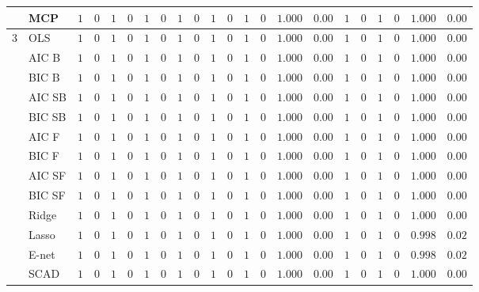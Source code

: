 \begin{tabular}{p{0.2cm}p{1cm}|p{0.6cm}p{0.6cm}|p{0.6cm}p{0.6cm}p{0.6cm}p{0.6cm}p{0.6cm}p{0.6cm}|p{0.6cm}p{0.6cm}p{0.6cm}p{0.6cm}p{0.6cm}p{0.6cm}|p{0.6cm}p{0.6cm}p{0.6cm}p{0.6cm}p{0.6cm}p{0.6cm}}
 & MCP  & $1$ & $0$ & $1$ & $0$ & $1$ & $0$ & $1$ & $0$ & $1$ & $0$ & $1$ & $0$ & $1.000$ & $0.00$ & $1$ & $0$ & $1$ & $0$ & $1.000$ & $0.00$ \\\hline
3 & OLS  & $1$ & $0$ & $1$ & $0$ & $1$ & $0$ & $1$ & $0$ & $1$ & $0$ & $1$ & $0$ & $1.000$ & $0.00$ & $1$ & $0$ & $1$ & $0$ & $1.000$ & $0.00$ \\
 & AIC B  & $1$ & $0$ & $1$ & $0$ & $1$ & $0$ & $1$ & $0$ & $1$ & $0$ & $1$ & $0$ & $1.000$ & $0.00$ & $1$ & $0$ & $1$ & $0$ & $1.000$ & $0.00$ \\
 & BIC B  & $1$ & $0$ & $1$ & $0$ & $1$ & $0$ & $1$ & $0$ & $1$ & $0$ & $1$ & $0$ & $1.000$ & $0.00$ & $1$ & $0$ & $1$ & $0$ & $1.000$ & $0.00$ \\
 & AIC SB  & $1$ & $0$ & $1$ & $0$ & $1$ & $0$ & $1$ & $0$ & $1$ & $0$ & $1$ & $0$ & $1.000$ & $0.00$ & $1$ & $0$ & $1$ & $0$ & $1.000$ & $0.00$ \\
 & BIC SB  & $1$ & $0$ & $1$ & $0$ & $1$ & $0$ & $1$ & $0$ & $1$ & $0$ & $1$ & $0$ & $1.000$ & $0.00$ & $1$ & $0$ & $1$ & $0$ & $1.000$ & $0.00$ \\
 & AIC F  & $1$ & $0$ & $1$ & $0$ & $1$ & $0$ & $1$ & $0$ & $1$ & $0$ & $1$ & $0$ & $1.000$ & $0.00$ & $1$ & $0$ & $1$ & $0$ & $1.000$ & $0.00$ \\
 & BIC F  & $1$ & $0$ & $1$ & $0$ & $1$ & $0$ & $1$ & $0$ & $1$ & $0$ & $1$ & $0$ & $1.000$ & $0.00$ & $1$ & $0$ & $1$ & $0$ & $1.000$ & $0.00$ \\
 & AIC SF  & $1$ & $0$ & $1$ & $0$ & $1$ & $0$ & $1$ & $0$ & $1$ & $0$ & $1$ & $0$ & $1.000$ & $0.00$ & $1$ & $0$ & $1$ & $0$ & $1.000$ & $0.00$ \\
 & BIC SF  & $1$ & $0$ & $1$ & $0$ & $1$ & $0$ & $1$ & $0$ & $1$ & $0$ & $1$ & $0$ & $1.000$ & $0.00$ & $1$ & $0$ & $1$ & $0$ & $1.000$ & $0.00$ \\
 & Ridge  & $1$ & $0$ & $1$ & $0$ & $1$ & $0$ & $1$ & $0$ & $1$ & $0$ & $1$ & $0$ & $1.000$ & $0.00$ & $1$ & $0$ & $1$ & $0$ & $1.000$ & $0.00$ \\
 & Lasso  & $1$ & $0$ & $1$ & $0$ & $1$ & $0$ & $1$ & $0$ & $1$ & $0$ & $1$ & $0$ & $1.000$ & $0.00$ & $1$ & $0$ & $1$ & $0$ & $0.998$ & $0.02$ \\
 & E-net  & $1$ & $0$ & $1$ & $0$ & $1$ & $0$ & $1$ & $0$ & $1$ & $0$ & $1$ & $0$ & $1.000$ & $0.00$ & $1$ & $0$ & $1$ & $0$ & $0.998$ & $0.02$ \\
 & SCAD  & $1$ & $0$ & $1$ & $0$ & $1$ & $0$ & $1$ & $0$ & $1$ & $0$ & $1$ & $0$ & $1.000$ & $0.00$ & $1$ & $0$ & $1$ & $0$ & $1.000$ & $0.00$ \\

\end{tabular}
